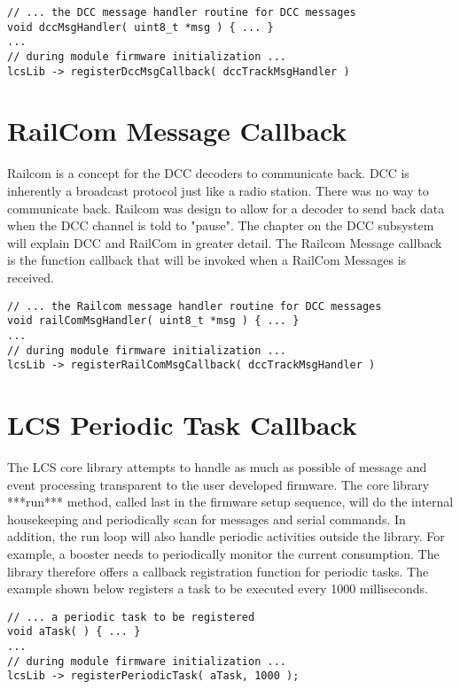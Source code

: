 \lstset{style=codesnippetstyle}
\begin{lstlisting}
// ... the DCC message handler routine for DCC messages
void dccMsgHandler( uint8_t *msg ) { ... }
...
// during module firmware initialization ...
lcsLib -> registerDccMsgCallback( dccTrackMsgHandler )
\end{lstlisting}

\section{RailCom Message Callback}

Railcom is a concept for the DCC decoders to communicate back. DCC is inherently a broadcast protocol just like a radio station. There was no way to communicate back.  Railcom was design to allow for a decoder to send back data when the DCC channel is told to "pause". The chapter on the DCC subsystem will explain DCC and RailCom in greater detail. The Railcom Message callback is the function callback that will be invoked when a RailCom Messages is received.

\lstset{style=codesnippetstyle}
\begin{lstlisting}
// ... the Railcom message handler routine for DCC messages
void railComMsgHandler( uint8_t *msg ) { ... }
...
// during module firmware initialization ...
lcsLib -> registerRailComMsgCallback( dccTrackMsgHandler )
\end{lstlisting}

\section{LCS Periodic Task Callback}

The LCS core library attempts to handle as much as possible of message and event processing transparent to the user developed firmware. The core library ***run*** method, called last in the firmware setup sequence, will do the internal housekeeping and periodically scan for messages and serial commands. In addition, the run loop will also handle periodic activities outside the library. For example, a booster needs to periodically monitor the current consumption. The library therefore offers a callback registration function for periodic tasks. The example shown below registers a task to be executed every 1000 milliseconds.

\lstset{style=codesnippetstyle}
\begin{lstlisting}
// ... a periodic task to be registered
void aTask( ) { ... }
...
// during module firmware initialization ...
lcsLib -> registerPeriodicTask( aTask, 1000 );
\end{lstlisting}

